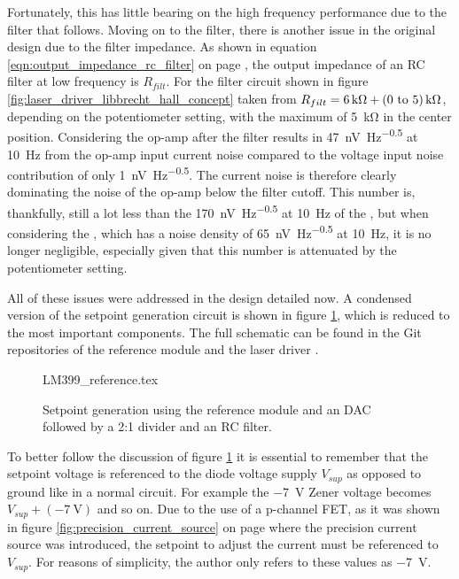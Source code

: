 Fortunately, this has little bearing on the high frequency performance due to the filter that follows. Moving on to the filter, there is another issue in the original design due to the filter impedance. As shown in equation \ref{eqn:output_impedance_rc_filter} on page \pageref{eqn:output_impedance_rc_filter}, the output impedance of an RC filter at low frequency is $R_{filt}$. For the filter circuit shown in figure \ref{fig:laser_driver_libbrecht_hall_concept} taken from \cite{libbrecht_hall} $R_{filt} = \qty{6}{\kilo\ohm} + \qtyrange[range-units = bracket, range-phrase=\textup{~to~}]{0}{5}{\kilo\ohm}$, depending on the potentiometer setting, with the maximum of \qty{5}{\kilo \ohm} in the center position. Considering the  op-amp after the filter results in \qty[power-half-as-sqrt]{47}{\nV \per \Hz\tothe{0.5}} at \qty{10}{\Hz} from the op-amp input current noise compared to the voltage input noise contribution of only \qty[power-half-as-sqrt]{1}{\nV \per \Hz\tothe{0.5}}. The current noise is therefore clearly dominating the noise of the op-amp below the filter cutoff. This number is, thankfully, still a lot less than the \qty[power-half-as-sqrt]{170}{\nV \per \Hz\tothe{0.5}} at \qty{10}{\Hz} of the , but when considering the , which has a noise density of \qty[power-half-as-sqrt]{65}{\nV \per \Hz\tothe{0.5}} at \qty{10}{\Hz}, it is no longer negligible, especially given that this number is attenuated by the potentiometer setting.

All of these issues were addressed in the design detailed now. A condensed version of the setpoint generation circuit is shown in figure \ref{fig:dgDrive_setpoint_generation}, which is reduced to the most important components. The full schematic can be found in the Git repositories of the reference module and the laser driver \cite{git_dgDrive,git_dgDrive_reference}.
\begin{figure}[ht]
    \centering
        {LM399_reference.tex}
    \caption{Setpoint generation using the  reference module and an  DAC followed by a 2:1 divider and an RC filter.}
    \label{fig:dgDrive_setpoint_generation}
\end{figure}

To better follow the discussion of figure \ref{fig:dgDrive_setpoint_generation} it is essential to remember that the setpoint voltage is referenced to the diode voltage supply $V_{sup}$ as opposed to ground like in a normal circuit. For example the \qty{-7}{\V} Zener voltage becomes $V_{sup} + (\qty{-7}{\V})$ and so on. Due to the use of a p-channel FET, as it was shown in figure \ref{fig:precision_current_source} on page \pageref{fig:precision_current_source} where the precision current source was introduced, the setpoint to adjust the current must be referenced to $V_{sup}$. For reasons of simplicity, the author only refers to these values as \qty{-7}{\V}.

